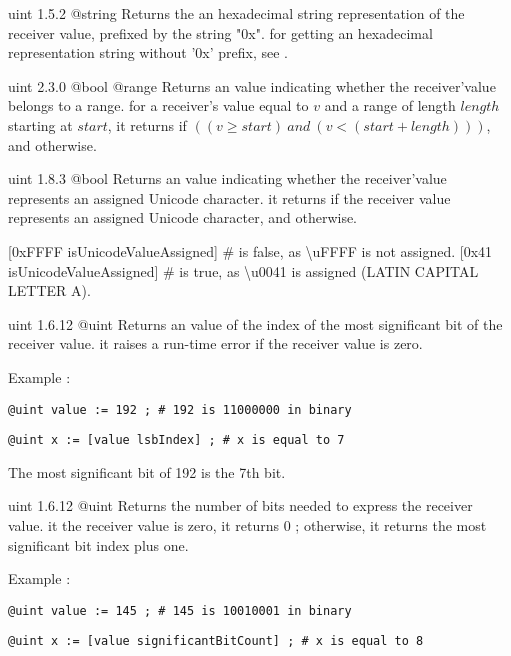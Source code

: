 {uint}
{1.5.2}
{@string}
{Returns the an hexadecimal string representation of the receiver value, prefixed by the string "0x".}
{for getting an hexadecimal representation string without '0x' prefix, see .}



{uint}
{2.3.0}
{@bool}
{@range}
{Returns an  value indicating whether the receiver'value belongs to a range.}
{for a receiver's value equal to $v$ and a range of length $length$ starting at $start$, it returns  if $((v \geqslant start)~and~(v<(start+length)))$, and  otherwise.}



{uint}
{1.8.3}
{@bool}
{Returns an  value indicating whether the receiver'value represents an assigned Unicode character.}
{it returns  if the receiver value represents an assigned Unicode character,  and otherwise.}

\exempleDeuxLignes
{}
{[0xFFFF isUnicodeValueAssigned] \# is false, as \textbackslash uFFFF is not assigned.}
{[0x41 isUnicodeValueAssigned] \# is true, as \textbackslash u0041 is assigned (LATIN CAPITAL LETTER A).}



{uint}
{1.6.12}
{@uint}
{Returns an  value of the index of the most significant bit of the receiver value.}
{it raises a run-time error if the receiver value is zero.}

Example :

\texttt{@uint value := 192 ; \# 192 is 11000000 in binary}

\texttt{@uint x := [value lsbIndex] ; \# x is equal to 7}

The most significant bit of 192 is the 7th bit.




{uint}
{1.6.12}
{@uint}
{Returns the number of bits needed to express the receiver value.}
{it the receiver value is zero, it returns 0 ; otherwise, it returns the most significant bit index plus one.}

Example :

\texttt{@uint value := 145 ; \# 145 is 10010001 in binary}

\texttt{@uint x := [value significantBitCount] ; \# x is equal to 8}





